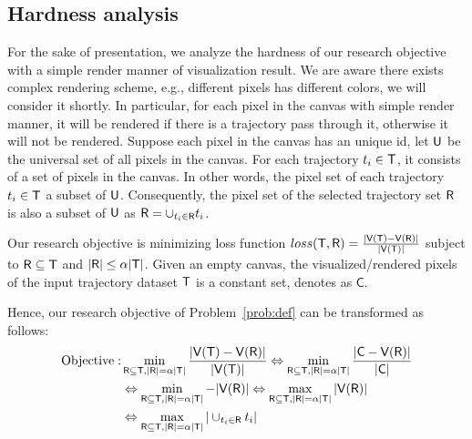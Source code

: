 



\subsection{Hardness analysis}\label{sec:hard}
For the sake of presentation, we analyze the hardness of our research objective with a simple render manner of visualization result.
We are aware there exists complex rendering scheme, e.g., different pixels has different colors, we will consider it shortly.
In particular, for each pixel in the canvas with simple render manner, it will be rendered if there is a trajectory pass through it, otherwise it will not be rendered.
Suppose each pixel in the canvas has an unique id, let $\mathsf{U}$ be the universal set of all pixels in the canvas.
For each trajectory $t_i \in \mathsf{T}$, it consists of a set of pixels in the canvas.
In other words, the pixel set of each trajectory $t_i \in \mathsf{T}$ a subset of $\mathsf{U}$.
Consequently, the pixel set of the selected trajectory set $\mathsf{R}$ is also a subset of $\mathsf{U}$ as $\mathsf{R} = \cup_{t_i \in \mathsf{R}} t_i$.


Our research objective is minimizing loss function $loss(\mathsf{T}, \mathsf{R}) =  \frac{|\mathsf{V}(\mathsf{T}) - \mathsf{V}(\mathsf{R})|}{|\mathsf{V}(\mathsf{T})|}$ subject to $\mathsf{R} \subseteq \mathsf{T}$ and $|\mathsf{R}| \leq \alpha |\mathsf{T}|$.
Given an empty canvas, the visualized/rendered pixels of the input trajectory dataset $\mathsf{T}$ is a constant set, denotes as $\mathsf{C}$.

Hence, our research objective of Problem~\ref{prob:def} can be transformed as follows:
\begin{align}\label{eqn:obj2} \nonumber
\text{Objective}: & \min_{\oR \subseteq \D, |\oR| = \alpha |\D|}  \frac{|\V(\D) - \V(\oR)|}{|\V(\D)|} \Leftrightarrow \min_{\oR \subseteq \D, |\oR| = \alpha |\D|}  \frac{|\mathsf{C} - \V(\oR)|}{|\mathsf{C}|}  \\ \nonumber %
& \Leftrightarrow \min_{\oR \subseteq \D, |\oR| = \alpha |\D|}   - |\V(\oR)| \Leftrightarrow \max_{\oR \subseteq \D, |\oR| = \alpha |\D|}  |\V(\oR)|  \\ \nonumber
& \Leftrightarrow \max_{\oR \subseteq \D, |\oR| = \alpha |\D|} | \cup_{t_i \in \oR} t_i |
\end{align}

